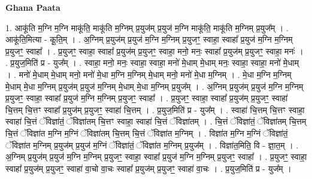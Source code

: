 \documentclass[17pt]{extarticle}
\begin{document}
\textbf{Ghana Paata } \newline

1. आकू॑ति म॒ग्नि म॒ग्नि माकू॑ति॒ माकू॑ति म॒ग्निम् प्र॒युज॑म् प्र॒युज॑ म॒ग्नि माकू॑ति॒ माकू॑ति म॒ग्निम् प्र॒युज᳚म् । . आकू॑ति॒मित्या - कू॒ति॒म् । . अ॒ग्निम् प्र॒युज॑म् प्र॒युज॑ म॒ग्नि म॒ग्निम् प्र॒युजꣳ॒॒ स्वाहा॒ स्वाहा᳚ प्र॒युज॑ म॒ग्नि म॒ग्निम् प्र॒युजꣳ॒॒ स्वाहा᳚ । . प्र॒युजꣳ॒॒ स्वाहा॒ स्वाहा᳚ प्र॒युज॑म् प्र॒युजꣳ॒॒ स्वाहा॒ मनो॒ मनः॒ स्वाहा᳚ प्र॒युज॑म् प्र॒युजꣳ॒॒ स्वाहा॒ मनः॑ । . प्र॒युज॒मिति॑ प्र - युज᳚म् । . स्वाहा॒ मनो॒ मनः॒ स्वाहा॒ स्वाहा॒ मनो॑ मे॒धाम् मे॒धाम् मनः॒ स्वाहा॒ स्वाहा॒ मनो॑ मे॒धाम् । . मनो॑ मे॒धाम् मे॒धाम् मनो॒ मनो॑ मे॒धा म॒ग्नि म॒ग्निम् मे॒धाम् मनो॒ मनो॑ मे॒धा म॒ग्निम् । . मे॒धा म॒ग्नि म॒ग्निम् मे॒धाम् मे॒धा म॒ग्निम् प्र॒युज॑म् प्र॒युज॑ म॒ग्निम् मे॒धाम् मे॒धा म॒ग्निम् प्र॒युज᳚म् । . अ॒ग्निम् प्र॒युज॑म् प्र॒युज॑ म॒ग्नि म॒ग्निम् प्र॒युजꣳ॒॒ स्वाहा॒ स्वाहा᳚ प्र॒युज॑ म॒ग्नि म॒ग्निम् प्र॒युजꣳ॒॒ स्वाहा᳚ । . प्र॒युजꣳ॒॒ स्वाहा॒ स्वाहा᳚ प्र॒युज॑म् प्र॒युजꣳ॒॒ स्वाहा॑ चि॒त्तम् चि॒त्तꣳ स्वाहा᳚ प्र॒युज॑म् प्र॒युजꣳ॒॒ स्वाहा॑ चि॒त्तम् । . प्र॒युज॒मिति॑ प्र - युज᳚म् । . स्वाहा॑ चि॒त्तम् चि॒त्तꣳ स्वाहा॒ स्वाहा॑ चि॒त्तं ॅविज्ञा॑तं॒ ॅविज्ञा॑तम् चि॒त्तꣳ स्वाहा॒ स्वाहा॑ चि॒त्तं ॅविज्ञा॑तम् । . चि॒त्तं ॅविज्ञा॑तं॒ ॅविज्ञा॑तम् चि॒त्तम् चि॒त्तं ॅविज्ञा॑त म॒ग्नि म॒ग्निं ॅविज्ञा॑तम् चि॒त्तम् चि॒त्तं ॅविज्ञा॑त म॒ग्निम् । . विज्ञा॑त म॒ग्नि म॒ग्निं ॅविज्ञा॑तं॒ ॅविज्ञा॑त म॒ग्निम् प्र॒युज॑म् प्र॒युज॑ म॒ग्निं ॅविज्ञा॑तं॒ ॅविज्ञा॑त म॒ग्निम् प्र॒युज᳚म् । . विज्ञा॑त॒मिति॒ वि - ज्ञा॒त॒म् । . अ॒ग्निम् प्र॒युज॑म् प्र॒युज॑ म॒ग्नि म॒ग्निम् प्र॒युजꣳ॒॒ स्वाहा॒ स्वाहा᳚ प्र॒युज॑ म॒ग्नि म॒ग्निम् प्र॒युजꣳ॒॒ स्वाहा᳚ । . प्र॒युजꣳ॒॒ स्वाहा॒ स्वाहा᳚ प्र॒युज॑म् प्र॒युजꣳ॒॒ स्वाहा॑ वा॒चो वा॒चः स्वाहा᳚ प्र॒युज॑म् प्र॒युजꣳ॒॒ स्वाहा॑ वा॒चः । . प्र॒युज॒मिति॑ प्र - युज᳚म् । \newline
\end{document}
